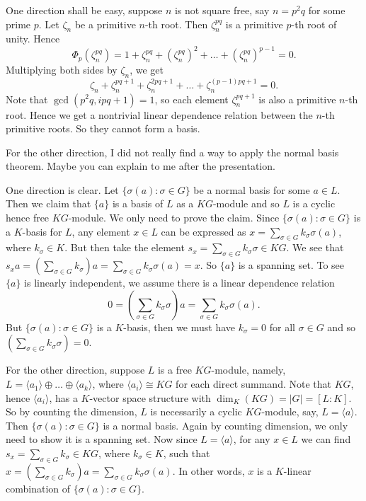 \documentclass[12pt,reqno]{article}
\theoremstyle{definition}
\newcommand{\ta}[1]{\langle #1 \rangle}
\begin{document}
\begin{solution}{5}
	One direction shall be easy, suppose $n$ is not square free, say $n=p^2q$ for some prime $p$. Let $\zeta_n$ be a primitive $n$-th root. Then $\zeta_n^{pq}$ is a primitive $p$-th root of unity. Hence $$\Phi_p(\zeta_n^{pq}) = 1+ \zeta_n^{pq} +(\zeta_n^{pq})^2+\dots+(\zeta_n^{pq})^{p-1} =0.$$ Multiplying  both sides by $\zeta_n$, we get \[  \zeta_n + \zeta_n^{pq+1} +\zeta_n^{2pq+1}+\dots+\zeta_n^{(p-1)pq+1}=0.\] Note that $\gcd(p^2q, ipq+1)=1$, so each element $\zeta_n^{pq+1}$ is also a primitive $n$-th root. Hence we get a nontrivial linear dependence relation between the $n$-th primitive roots. So they cannot form a basis.

	For the other direction, I did not really find a way to apply the normal basis theorem. Maybe you can explain to me after the presentation.
\end{solution}

\begin{solution}{6}
	One direction is clear. Let $\{\sigma(a):\sigma\in G\}$ be a normal basis for some $a\in L$. Then we claim that $\{a\}$ is a basis of $L$ as a $KG$-module and so $L$ is a cyclic hence free $KG$-module. We only need to prove the claim. Since $\{\sigma(a):\sigma\in G\}$ is a $K$-basis for $L$, any element $x\in L$ can be expressed as $x=\sum_{\sigma\in G} k_{\sigma} \sigma(a)$, where $k_\sigma\in K$. But then take the element $s_x=\sum_{\sigma\in G} k_\sigma \sigma\in KG$. We see that $s_xa=(\sum_{\sigma\in G} k_\sigma)a = \sum_{\sigma\in G} k_{\sigma} \sigma(a) = x$. So $\{a\}$ is a spanning set. To see $\{a\}$ is linearly independent, we assume there is a linear dependence relation $$0=(\sum_{\sigma\in G} k_\sigma \sigma)a=\sum_{\sigma\in G} k_{\sigma} \sigma(a).$$ But $\{\sigma(a):\sigma\in G\}$ is a $K$-basis, then we must have $k_\sigma=0$ for all $\sigma\in G$ and so  $(\sum_{\sigma\in G} k_\sigma \sigma)=0$.


	For the other direction, suppose $L$ is a free $KG$-module, namely, $L=\ta{a_1}\oplus \dots\oplus \ta{a_k}$, where $\ta{a_i}\cong KG$ for each direct summand. Note that $KG$, hence $\ta{a_i}$, has a $K$-vector space structure with $\dim_K(KG)=|G|=[L:K]$. So by counting the dimension, $L$ is necessarily a cyclic $KG$-module, say, $L=\ta{a}$. Then $\{\sigma(a): \sigma\in G\}$ is a normal basis. Again by counting dimension, we only need to show it is a spanning set. Now since $L=\ta{a}$, for any $x\in L$ we can find $s_x=\sum_{\sigma\in G} k_\sigma\in KG$, where $k_\sigma\in K$, such that $x=(\sum_{\sigma\in G} k_\sigma)a =\sum_{\sigma\in G} k_{\sigma} \sigma(a)$. In other words, $x$ is a $K$-linear combination of  $\{\sigma(a): \sigma\in G\}$.

\end{solution}
\end{document}
